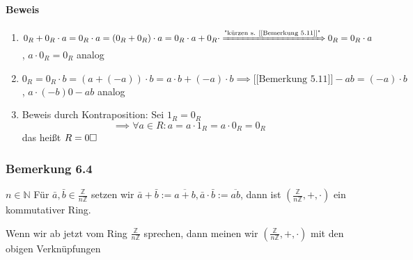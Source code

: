 \documentclass[a4paper]{scrartcl}
\DeclareMathOperator{\Forall}{\forall}
\theoremstyle{definition}
\theoremstyle{plain}
\theoremstyle{plain}
\theoremstyle{remark}
\theoremstyle{remark}
\theoremstyle{remark}
\theoremstyle{remark}
\theoremstyle{remark}
\begin{document}
\paragraph{Beweis}
\label{sec-3-2-3-1}
\begin{enumerate}
\item $0_R + 0_R\cdot a = 0_R\cdot a = (0_R + 0_R)\cdot a = 0_R\cdot a + 0_R\cdot \xRightarrow{\text{"kürzen s. [[Bemerkung 5.11]]"}} 0_R = 0_R \cdot a$, $a\cdot 0_R = 0_R$ analog
\item $0_R = 0_R\cdot b = (a + (-a))\cdot b = a\cdot b + (-a) \cdot b \implies{\text{[[Bemerkung 5.11]]}} - a b = (-a)\cdot b$, $a\cdot(-b) 0 -a b$ analog
\item Beweis durch Kontraposition: Sei $1_R = 0_R$
        \[\implies \Forall a\in R: a = a\cdot 1_R = a\cdot 0_R = 0_R\]
        das heißt $R = 0\hfill\square$
\end{enumerate}
\subsubsection{Bemerkung 6.4}
\label{sec-3-2-4}
$n\in\mathbb{N}$ Für $\bar a, \bar b \in\frac{\mathbb{Z}}{n\mathbb{Z}}$ setzen wir $\bar a + \bar b := \overline{a + b}, \bar a\cdot \bar b := \overline{ab}$, dann ist $(\frac{\mathbb{Z}}{n\mathbb{Z}},+,\cdot)$ ein kommutativer Ring.

Wenn wir ab jetzt vom Ring $\frac{\mathbb{Z}}{n\mathbb{Z}}$ sprechen, dann meinen wir $(\frac{\mathbb{Z}}{n\mathbb{Z}},+,\cdot)$ mit den obigen Verknüpfungen
\end{document}
